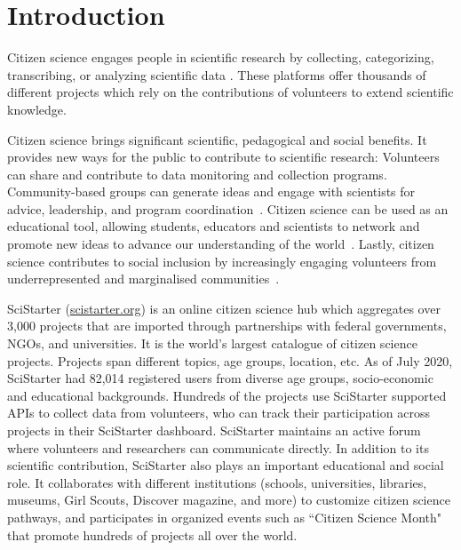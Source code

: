 \documentclass[letterpaper]{article} %
\begin{document}
%
% 
\section{Introduction}

Citizen science engages people in scientific research  by collecting, categorizing, transcribing, or analyzing scientific data \cite{bonney2009citizen,funk2017science,brossard2005scientific}. 
 These platforms 
 offer thousands of different projects which rely on the contributions of volunteers to extend 
 scientific knowledge. 
 
    Citizen science brings   significant scientific, pedagogical and social benefits. It provides new ways for the public to 
   contribute to scientific research: Volunteers  
   can share and contribute to data monitoring and collection programs. Community-based groups can generate ideas and engage with scientists for advice, leadership, and program coordination~\cite{silvertown2009new,bonney2014next,ryan2018role}. Citizen science can be used as an educational tool, allowing students, educators and scientists to  network and promote new ideas to advance our understanding of the world~\cite{vitone2016school}. Lastly, citizen science contributes to social inclusion by increasingly engaging volunteers from underrepresented and marginalised communities~\cite{haywood2014education,sorensen2019reflecting}.
  
    
      SciStarter (\url{scistarter.org}) is  an online citizen science hub  which aggregates over 
      3,000 projects that are imported through partnerships with federal governments, NGOs, and universities. It is the world’s largest catalogue of citizen science projects.  Projects span different topics, age groups, location, etc. As of July 2020, SciStarter had  82,014 registered users   from diverse age groups, socio-economic and educational backgrounds. Hundreds of the projects use SciStarter supported APIs to collect data from volunteers, who can track their participation  across projects in their SciStarter dashboard. SciStarter maintains 
      an active forum where volunteers and researchers can communicate directly. In addition to its scientific contribution, SciStarter also plays an important educational and social role. It collaborates with 
     different institutions (schools, universities, libraries, museums, Girl Scouts, Discover magazine, and more)  to customize citizen science pathways, and participates in 
      organized events such as ``Citizen Science Month" that promote hundreds of projects all over the world.
      
\end{document}

